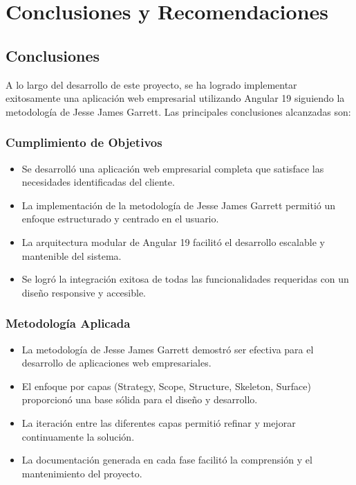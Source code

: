 \chapter{Conclusiones y Recomendaciones}

\section{Conclusiones}

A lo largo del desarrollo de este proyecto, se ha logrado implementar exitosamente una aplicación web empresarial utilizando Angular 19 siguiendo la metodología de Jesse James Garrett. Las principales conclusiones alcanzadas son:

\subsection{Cumplimiento de Objetivos}

\begin{itemize}
    \item Se desarrolló una aplicación web empresarial completa que satisface las necesidades identificadas del cliente.
    \item La implementación de la metodología de Jesse James Garrett permitió un enfoque estructurado y centrado en el usuario.
    \item La arquitectura modular de Angular 19 facilitó el desarrollo escalable y mantenible del sistema.
    \item Se logró la integración exitosa de todas las funcionalidades requeridas con un diseño responsive y accesible.
\end{itemize}

\subsection{Metodología Aplicada}

\begin{itemize}
    \item La metodología de Jesse James Garrett demostró ser efectiva para el desarrollo de aplicaciones web empresariales.
    \item El enfoque por capas (Strategy, Scope, Structure, Skeleton, Surface) proporcionó una base sólida para el diseño y desarrollo.
    \item La iteración entre las diferentes capas permitió refinar y mejorar continuamente la solución.
    \item La documentación generada en cada fase facilitó la comprensión y el mantenimiento del proyecto.
\end{itemize}


